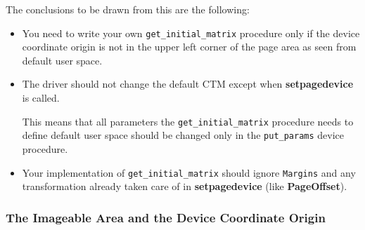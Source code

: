 \documentclass[twoside,a4paper]{article}
\newcommand{\ps}[1]{{\sffamily\bfseries #1}}	%
\newcommand{\prog}[1]{\texttt{#1}}
\newif\ifdraft \draftfalse
\begin{document}
The conclusions to be drawn from this are the following:
\begin{itemize}
  \item You need to write your own \prog{get\_initial\_matrix} procedure only
    if the device coordinate origin is not in the upper left corner of the
    page area as seen from default user space.
  \item The driver should not change the default CTM except when
    \ps{setpagedevice} is called.

    This means that all parameters the \prog{get\_initial\_matrix} procedure
    needs to define default user space should be changed only in the
    \prog{put\_params} device procedure.
  \item Your implementation of \prog{get\_initial\_matrix} should ignore
    \prog{Margins} and any transformation already taken care of in
    \ps{setpagedevice} (like \ps{PageOffset}).
\end{itemize}

\ifdraft
??? Discuss the soft-tumble problem and its solution.
\fi


\subsubsection{The Imageable Area and the Device Coordinate Origin}
\label{HardwareMargins}
\end{document}
